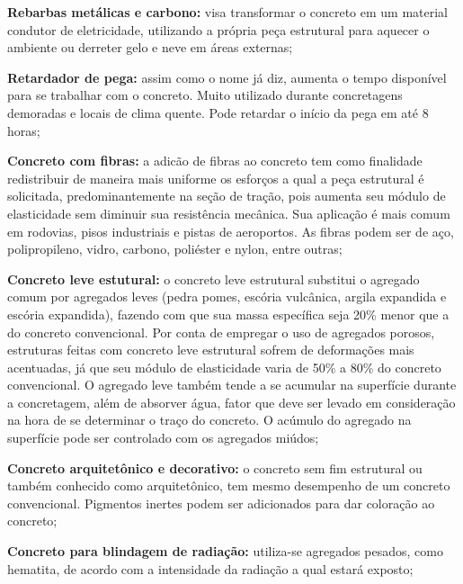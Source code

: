 \begin{alineas}
\begin{incisos}
      \item \textbf{Rebarbas metálicas e carbono:} visa transformar o concreto em um material condutor de eletricidade, utilizando a própria peça estrutural para aquecer o ambiente ou derreter gelo e neve em áreas externas;
      
	  \item \textbf{Retardador de pega:} assim como o nome já diz, aumenta o tempo disponível para se trabalhar com o concreto. Muito utilizado durante concretagens demoradas e locais de clima quente. Pode retardar o início da pega em até 8 horas;
    \end{incisos}
    
    \item \textbf{Concreto com fibras:} a adicão de fibras ao concreto tem como finalidade redistribuir de maneira mais uniforme os esforços a qual a peça estrutural é solicitada, predominantemente na seção de tração, pois aumenta seu módulo de elasticidade sem diminuir sua resistência mecânica. Sua aplicação é mais comum em rodovias, pisos industriais e pistas de aeroportos. As fibras podem ser de aço, polipropileno, vidro, carbono, poliéster e nylon, entre outras;
    
    \item \textbf{Concreto leve estutural:} o concreto leve estrutural substitui o agregado comum por agregados leves (pedra pomes, escória vulcânica, argila expandida e escória expandida), fazendo com que sua massa específica seja 20\% menor que a do concreto convencional. Por conta de empregar o uso de agregados porosos, estruturas feitas com concreto leve estrutural sofrem de deformações mais acentuadas, já que seu módulo de elasticidade varia de 50\% a 80\% do concreto convencional. O agregado leve também tende a se acumular na superfície durante a concretagem, além de absorver água, fator que deve ser levado em consideração na hora de se determinar o traço do concreto. O acúmulo do agregado na superfície pode ser controlado com os agregados miúdos;
    
    \item \textbf{Concreto arquitetônico e decorativo:} 
    o concreto sem fim estrutural ou também conhecido como arquitetônico, tem mesmo desempenho de um concreto convencional. Pigmentos inertes podem ser adicionados para dar coloração ao concreto;
    
   
    \item \textbf{Concreto para blindagem de radiação:} utiliza-se agregados pesados, como hematita, de acordo com a intensidade da radiação a qual estará exposto;
    

\end{alineas}
